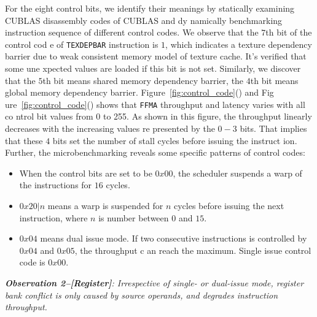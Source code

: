 For the eight control bits, we identify their meanings by statically examining CUBLAS disassembly codes of CUBLAS and dy
namically benchmarking instruction sequence of different control codes. We observe that the $7$th bit of the control cod
e of {\tt TEXDEPBAR} instruction is $1$, which
indicates a texture dependency barrier due to weak consistent memory model of texture cache. It's verified that some une
xpected values are
loaded if this bit is not set. Similarly, we discover that the $5$th bit means shared memory dependency barrier, the
$4$th bit means global memory dependency barrier. Figure~\ref{fig:control_code}() and Fig
ure~\ref{fig:control_code}() shows that {\tt FFMA} throughput and latency varies with all co
ntrol bit values from 0 to 255. As shown in this figure, the throughput linearly decreases with the increasing values re
presented by the $0-3$ bits. That implies that these $4$ bits set the number of stall cycles before issuing the instruct
ion. Further, the microbenchmarking reveals some specific patterns of control codes:

\begin{itemize}
\item When the control bits are set to be $0x00$, the scheduler suspends a warp of the instructions for $16$ cycles.
\item $0x20|n$ means a warp is suspended for $n$ cycles before issuing the next instruction, where $n$ is number between
 $0$ and $15$.
\item $0x04$ means dual issue mode. If two consecutive instructions is controlled by $0x04$ and $0x05$, the throughput c
an reach the maximum. Single issue control code is $0x00$.
\end{itemize}


{\em {\bf Observation 2--[Register]}: Irrespective of single- or dual-issue mode, register bank conflict is only caused 
by source operands, and degrades instruction throughput.}

